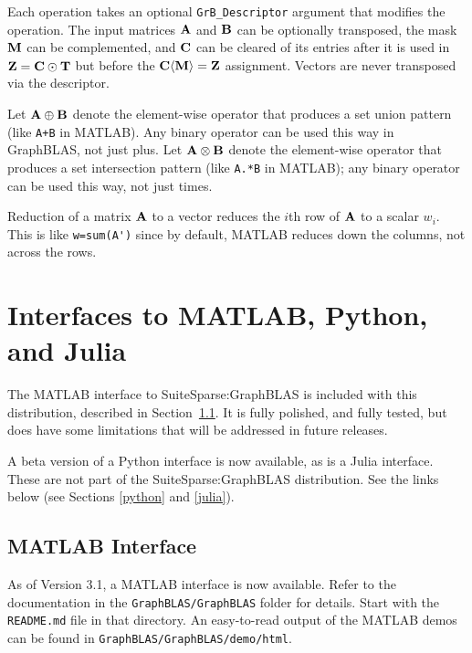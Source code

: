 \documentclass[12pt]{article}
\begin{document}
\vspace{0.05in}

Each operation takes an optional \verb'GrB_Descriptor' argument that modifies
the operation.  The input matrices ${\bf A}$ and ${\bf B}$ can be optionally
transposed, the mask ${\bf M}$ can be complemented, and ${\bf C}$ can be
cleared of its entries after it is used in ${\bf Z = C \odot T}$ but before
the ${\bf C \langle M \rangle = Z}$ assignment.
Vectors are never transposed via the descriptor.

Let ${\bf A \oplus B}$ denote the element-wise operator that produces a set
union pattern (like \verb'A+B' in MATLAB).  Any binary operator can be used
this way in GraphBLAS, not just plus.  Let ${\bf A \otimes B}$ denote the
element-wise operator that produces a set intersection pattern (like
\verb'A.*B' in MATLAB); any binary operator can be used this way, not just
times.

Reduction of a matrix ${\bf A}$ to a vector reduces the $i$th row of ${\bf A}$
to a scalar $w_i$.  This is like \verb"w=sum(A')" since by default, MATLAB
reduces down the columns, not across the rows.

\newpage
\section{Interfaces to MATLAB, Python, and Julia} %

The MATLAB interface to SuiteSparse:GraphBLAS is included with this
distribution, described in Section~\ref{matlab}.
It is fully polished, and fully tested, but does have
some limitations that will be addressed in future releases.

A beta version of a Python interface is now available, as is a
Julia interface.  These are not part of the SuiteSparse:GraphBLAS distribution.
See the links below (see Sections \ref{python} and \ref{julia}).

\subsection{MATLAB Interface}
\label{matlab}

As of Version 3.1, a MATLAB interface is now available.  Refer to the
documentation in the \verb'GraphBLAS/GraphBLAS' folder for details.  Start with
the \verb'README.md' file in that directory.  An easy-to-read output of the
MATLAB demos can be found in \verb'GraphBLAS/GraphBLAS/demo/html'.
\end{document}
